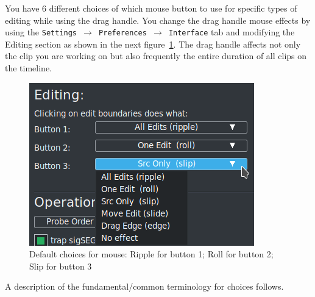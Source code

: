 You have 6 different choices of which mouse button to use for specific types of editing while using the drag handle.  You change the drag handle mouse effects by using the \texttt{Settings $\rightarrow$ Preferences  $\rightarrow$ Interface} tab and modifying the Editing section as shown in the next figure~\ref{fig:trim}. The drag handle affects not only the clip you are working on but also frequently the entire duration of all clips on the timeline.\\
\begin{figure}[htpb]
    \centering
    \includegraphics[width=0.6\linewidth]{images/trim.png}
    \caption{Default choices for mouse: Ripple for button 1; Roll for button 2; Slip for button 3}
    \label{fig:trim}
\end{figure}
A description of the fundamental/common terminology for choices follows.
